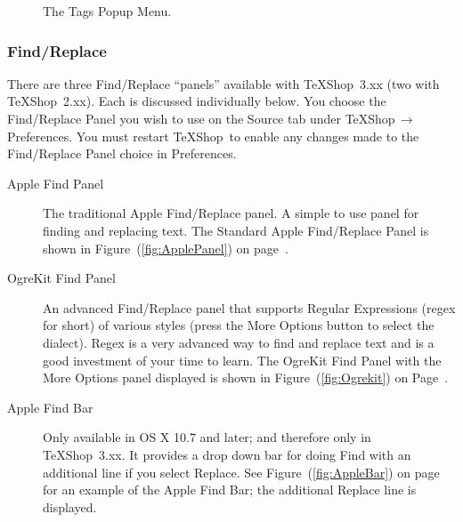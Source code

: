 \documentclass[letterpaper,11pt]{article}
\newcommand{\TS}{\textsf{\TeX Shop}}
\newcommand{\acr}[1]{\textsf{#1}}
\newcommand{\cmd}[1]{\textsf{#1}}
\newcommand{\mnu}[1]{\textsf{#1}}
\newcommand{\To}{\,\(\to\)\,}
\begin{document}
\begin{figure}
\centering
{}
\caption{The Tags Popup Menu.}
\label{fig:Tags}
\end{figure}

\subsubsection{Find/Replace}

There are three \acr{Find/Replace} ``panels'' available with \TS\ 3.xx (two with \TS\ 2.xx). Each is discussed individually below. You choose the Find/Replace Panel you wish to use on the \mnu{Source} tab under \mnu{TeXShop}\To\mnu{Preferences}. You must restart \TS\ to enable any changes made to the Find/Replace Panel choice in \mnu{Preferences}.
\begin{description}
\item[Apple Find Panel]
The traditional Apple Find/Replace panel. A simple to use panel for finding and replacing text.   The Standard Apple Find/Replace Panel is shown in Figure~(\ref{fig:ApplePanel}) on page~\pageref{fig:ApplePanel}.
\item[OgreKit Find Panel]
An advanced Find/Replace panel that supports Regular Expressions (\acr{regex} for short) of various styles (press the More Options button to select the dialect). \acr{Regex} is a very advanced way to find and replace text and is a good investment of your time to learn. The OgreKit Find Panel with the \cmd{More Options} panel displayed is shown in Figure~(\ref{fig:Ogrekit}) on Page~\pageref{fig:Ogrekit}.
\item[Apple Find Bar]
Only available in \cmd{OS X 10.7} and later; and therefore only in \acr{\TS\ 3.xx}. It provides a drop down bar for doing Find with an additional line if you select Replace. See  Figure~(\ref{fig:AppleBar}) on page~\pageref{fig:AppleBar} for an example of the Apple Find Bar; the additional Replace line is displayed.
\end{description}
\end{document}
